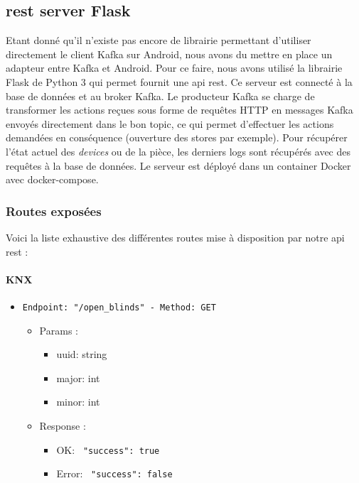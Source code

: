 \subsection{\acrshort{rest} server Flask}
Etant donné qu'il n'existe pas encore de librairie permettant d'utiliser directement le client Kafka sur Android, nous avons du mettre en place un adapteur entre Kafka et Android.
Pour ce faire, nous avons utilisé la librairie Flask \cite{flask} de Python 3 qui permet fournit une \acrshort{api} \acrshort{rest}. Ce serveur est connecté à la base de données et au broker Kafka. Le producteur Kafka se charge de transformer les actions reçues sous forme de requêtes HTTP en messages Kafka envoyés directement dans le bon topic, ce qui permet d'effectuer les actions demandées en conséquence (ouverture des stores par exemple). Pour récupérer l'état actuel des \textit{\textit{devices}} ou de la pièce, les derniers logs sont récupérés avec des requêtes à la base de données. Le serveur est déployé dans un container Docker avec docker-compose.

\subsubsection{Routes exposées}
Voici la liste exhaustive des différentes routes mise à disposition par notre \acrshort{api} \acrshort{rest} : 

\paragraph{KNX}

\begin{itemize}
  \item \texttt{Endpoint: "/open_blinds" -  Method: GET}
  \begin{itemize} 
    \item Params :
    \begin{itemize}
      \item uuid: string
      \item major: int
      \item minor: int
    \end{itemize}

    \item Response : 
    \begin{itemize}
      \item OK: \texttt{{ "success": true }}
      \item Error: \texttt{{ "success": false }}
    \end{itemize}
  \end{itemize}
\end{itemize}


